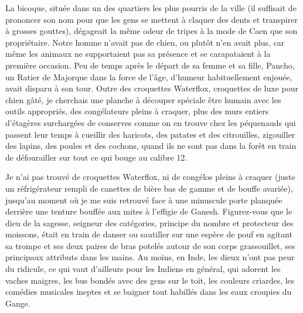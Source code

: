 La bicoque, située dans un des quartiers les plus pourris de la ville (il suffisait de prononcer son nom pour que les gens se mettent à claquer des dents et transpirer à grosses gouttes), dégageait la même odeur de tripes à la mode de Caen que son propriétaire. Notre homme n’avait pas de chien, ou plutôt n’en avait plus, car même les animaux ne supportaient pas sa présence et se carapataient à la première occasion. Peu de temps après le départ de sa femme et sa fille, Pancho, un Ratier de Majorque dans la force de l’âge, d’humeur habituellement enjouée, avait disparu à son tour. Outre des croquettes Waterflox, croquettes de luxe pour chien gâté, je cherchais une planche à découper spéciale être humain avec les outils appropriés, des congélateurs pleins à craquer, plus des murs entiers d’étagères surchargées de conserves comme on en trouve chez les péquenauds qui passent leur temps à cueillir des haricots, des patates et des citrouilles, zigouiller des lapins, des poules et des cochons, quand ils ne sont pas dans la forêt en train de défourailler sur tout ce qui bouge au calibre 12.

\illusloflabel{}%
Je n’ai pas trouvé de croquettes Waterflox, ni de congélos pleins à craquer (juste un réfrigérateur rempli de canettes de bière bas de gamme et de bouffe avariée), jusqu’au moment où je me suis retrouvé face à une minuscule porte planquée derrière une tenture bouffée aux mites à l’effigie de Ganesh. Figurez-vous que le dieu de la sagesse, seigneur des catégories, principe du nombre et protecteur des moissons, était en train de danser ou sautiller sur une espèce de pouf en agitant sa trompe et ses deux paires de bras potelés autour de son corps grassouillet, ses principaux attributs dans les mains. Au moins, en Inde, les dieux n’ont pas peur du ridicule, ce qui vaut d’ailleurs pour les Indiens en général, qui adorent les vaches maigres, les bus bondés avec des gens sur le toit, les couleurs criardes, les comédies musicales ineptes et se baigner tout habillés dans les eaux croupies du Gange.

